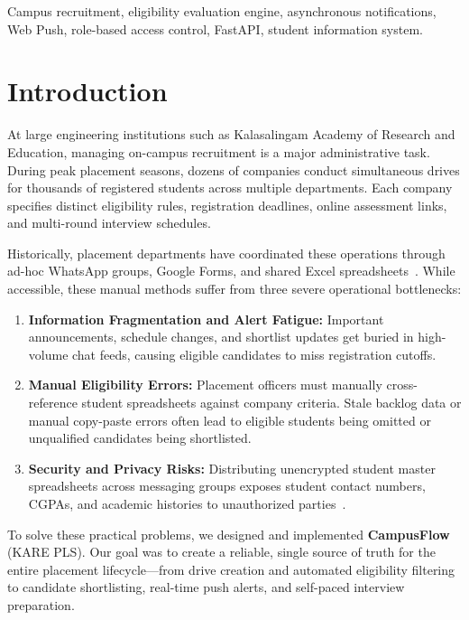 \documentclass[conference]{IEEEtran}
\begin{document}
\begin{IEEEkeywords}
Campus recruitment, eligibility evaluation engine, asynchronous notifications, Web Push, role-based access control, FastAPI, student information system.
\end{IEEEkeywords}

\section{Introduction}
At large engineering institutions such as Kalasalingam Academy of Research and Education, managing on-campus recruitment is a major administrative task. During peak placement seasons, dozens of companies conduct simultaneous drives for thousands of registered students across multiple departments. Each company specifies distinct eligibility rules, registration deadlines, online assessment links, and multi-round interview schedules.

Historically, placement departments have coordinated these operations through ad-hoc WhatsApp groups, Google Forms, and shared Excel spreadsheets~\cite{deshmukh2018centralized}. While accessible, these manual methods suffer from three severe operational bottlenecks:
\begin{enumerate}
    \item \textbf{Information Fragmentation and Alert Fatigue:} Important announcements, schedule changes, and shortlist updates get buried in high-volume chat feeds, causing eligible candidates to miss registration cutoffs.
    \item \textbf{Manual Eligibility Errors:} Placement officers must manually cross-reference student spreadsheets against company criteria. Stale backlog data or manual copy-paste errors often lead to eligible students being omitted or unqualified candidates being shortlisted.
    \item \textbf{Security and Privacy Risks:} Distributing unencrypted student master spreadsheets across messaging groups exposes student contact numbers, CGPAs, and academic histories to unauthorized parties~\cite{voigt2017eu}.
\end{enumerate}

To solve these practical problems, we designed and implemented \textbf{CampusFlow} (KARE PLS). Our goal was to create a reliable, single source of truth for the entire placement lifecycle---from drive creation and automated eligibility filtering to candidate shortlisting, real-time push alerts, and self-paced interview preparation.
\end{document}

